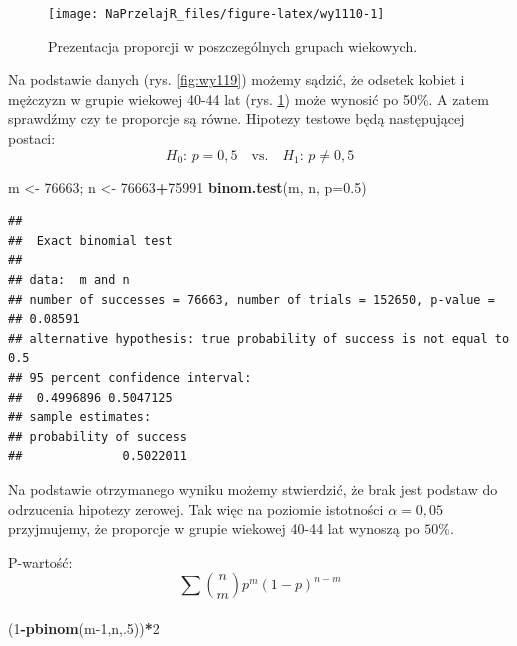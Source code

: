 \documentclass[polish,]{book}
\newenvironment{Shaded}{\begin{snugshade}}{\end{snugshade}}
\newcommand{\DataTypeTok}[1]{\textcolor[rgb]{0.13,0.29,0.53}{#1}}
\newcommand{\DecValTok}[1]{\textcolor[rgb]{0.00,0.00,0.81}{#1}}
\newcommand{\FloatTok}[1]{\textcolor[rgb]{0.00,0.00,0.81}{#1}}
\newcommand{\KeywordTok}[1]{\textcolor[rgb]{0.13,0.29,0.53}{\textbf{#1}}}
\newcommand{\NormalTok}[1]{#1}
\newcommand{\OperatorTok}[1]{\textcolor[rgb]{0.81,0.36,0.00}{\textbf{#1}}}
\newcommand{\StringTok}[1]{\textcolor[rgb]{0.31,0.60,0.02}{#1}}
\begin{document}
\begin{figure}[h]

{\centering \texttt{[image: NaPrzelajR\_files/figure-latex/wy1110-1]} 

}

\caption{Prezentacja proporcji w poszczególnych grupach wiekowych.}\label{fig:wy1110}
\end{figure}

Na podstawie danych (rys. \ref{fig:wy119}) możemy sądzić, że odsetek kobiet i mężczyzn w grupie wiekowej 40-44 lat (rys. \ref{fig:wy1110}) może wynosić po 50\%.
A zatem sprawdźmy czy te proporcje są równe. Hipotezy testowe będą następującej postaci:
\[H_0:\,p=0,5\quad\mbox{vs.}\quad H_1:\,p \neq 0,5\]

\begin{Shaded}
\begin{Highlighting}[]
\NormalTok{m <-}\StringTok{ }\DecValTok{76663}\NormalTok{; n <-}\StringTok{ }\DecValTok{76663}\OperatorTok{+}\DecValTok{75991}
\KeywordTok{binom.test}\NormalTok{(m, n, }\DataTypeTok{p=}\FloatTok{0.5}\NormalTok{)}
\end{Highlighting}
\end{Shaded}

\begin{verbatim}
## 
##  Exact binomial test
## 
## data:  m and n
## number of successes = 76663, number of trials = 152650, p-value =
## 0.08591
## alternative hypothesis: true probability of success is not equal to 0.5
## 95 percent confidence interval:
##  0.4996896 0.5047125
## sample estimates:
## probability of success 
##              0.5022011
\end{verbatim}

Na podstawie otrzymanego wyniku możemy stwierdzić, że brak jest podstaw do
odrzucenia hipotezy zerowej. Tak więc na poziomie istotności \(\alpha = 0,05\) przyjmujemy, że proporcje w grupie wiekowej 40-44 lat wynoszą po \(50\%\).

P-wartość:
\begin{equation}
\sum_{}^{}{n \choose m}p^m(1-p)^{n-m}
\label{eq:wz1153}
\end{equation}

\begin{Shaded}
\begin{Highlighting}[]
\NormalTok{(}\DecValTok{1}\OperatorTok{-}\KeywordTok{pbinom}\NormalTok{(m}\DecValTok{-1}\NormalTok{,n,.}\DecValTok{5}\NormalTok{))}\OperatorTok{*}\DecValTok{2}
\end{Highlighting}
\end{Shaded}
\end{document}
